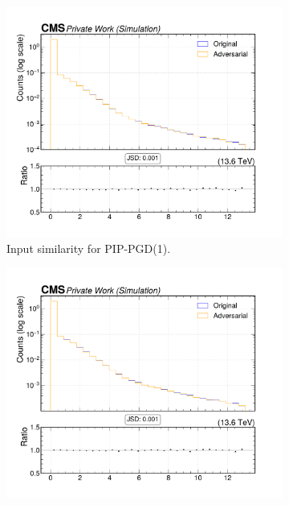 \begin{figure}[htbp]
  \centering
  \begin{subfigure}[t]{0.32\textwidth}
    \includegraphics[width=\linewidth]{media/output/features/compare/combined_it_1/cmp_vtx_arr_sv_mass.pdf}
    \caption*{Input similarity for PIP-PGD(1).}
  \end{subfigure}\hfill
  \begin{subfigure}[t]{0.32\textwidth}
    \includegraphics[width=\linewidth]{media/output/features/compare/combined_it_2/cmp_vtx_arr_sv_mass.pdf}

\end{subfigure}
\end{figure}
